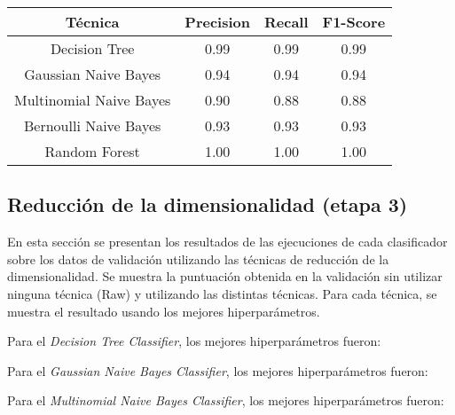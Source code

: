 \begin{center}
\begin{tabular}{|c|c|c|c|}
  \hline
  Técnica & Precision & Recall & F1-Score \\
  \hline
  Decision Tree & 0.99 & 0.99 & 0.99 \\
  \hline
  Gaussian Naive Bayes & 0.94 & 0.94 & 0.94 \\
  \hline
  Multinomial Naive Bayes & 0.90 & 0.88 & 0.88 \\
  \hline
  Bernoulli Naive Bayes & 0.93 & 0.93 & 0.93 \\
  \hline
  Random Forest & 1.00 & 1.00 & 1.00 \\
  \hline
\end{tabular}
\end{center}

\subsection{Reducción de la dimensionalidad (etapa 3)}

En esta secci\'on se presentan los resultados de las ejecuciones de cada clasificador sobre los datos de validaci\'on utilizando las t\'ecnicas de reducci\'on de la dimensionalidad.
Se muestra la puntuaci\'on obtenida en la validaci\'on sin utilizar ninguna t\'ecnica (Raw) y utilizando las distintas t\'ecnicas. Para cada t\'ecnica, se muestra el resultado usando los mejores hiperpar\'ametros.

Para el \emph{Decision Tree Classifier}, los mejores hiperpar\'ametros fueron:
\begin{itemize}
\end{itemize}

Para el \emph{Gaussian Naive Bayes Classifier}, los mejores hiperparámetros fueron:
\begin{itemize}
\end{itemize}

Para el \emph{Multinomial Naive Bayes Classifier}, los mejores hiperpar\'ametros fueron:
\begin{itemize}
\end{itemize}

